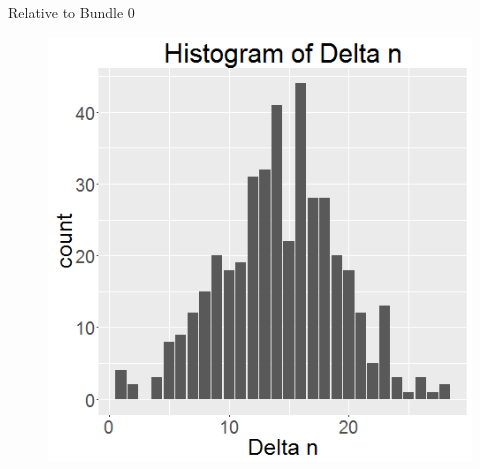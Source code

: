 \documentclass[xcolor=dvipsnames,11pt]{beamer}
\theoremstyle{definition}
\begin{document}
%
%
%
%
%
%
%
%
%
%
%
%
%
%
%
%
%
%
%
%
%
%
%
%
%
%
%
%
%
%
%
%
%
%
%
%
%
%
%
%
%
%
%
%
%
%
%
%
%
%
%
%
%
%
%
%
%
%
%
%
%
%
%
%
%
%
%
%
%
%
%
%
%
%
%
%
%
%
%

\begin{frame}{Relative to Bundle 0}
\begin{figure}
\graphicspath{ {../../0_relative_to_bundle_0/} }
\includegraphics[scale=0.43]{1_histogram_of_delta_n_rel_to_b0}
\end{figure}
\end{frame}
\end{document}
